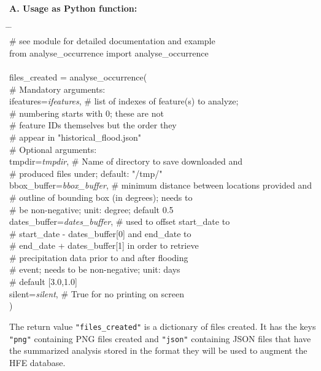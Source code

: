\documentclass[10pt,a4paper,titlepage,parskip]{scrartcl}
\newenvironment{ttfont}{\fontfamily{\ttdefault}\selectfont}{\par}
\newcommand{\GRAU}[1]{\textcolor{ufzgray2}{#1}}
\begin{document}
\textbf{A. Usage as Python function:}
\begin{framed}
	\vspace*{-1.2cm}
	\begin{ttfont}
		\begin{tabbing}
			\hspace{1.0cm} \= \hspace{5.2cm} \= \kill \\[4pt]
			\GRAU{\# see module for detailed documentation and example}\\
			from analyse\_occurrence import analyse\_occurrence\\
			\\
			files\_created = analyse\_occurrence(\\
			\> \GRAU{\# Mandatory arguments:}\\
			\> ifeatures=\textit{ifeatures}, \> \GRAU{\# list of indexes of feature(s) to analyze;}\\
			\> \> \GRAU{\# numbering starts with 0; these are not }\\
			\> \> \GRAU{\# feature IDs themselves but the order they }\\
			\> \> \GRAU{\# appear in "historical\_flood.json"}\\
			\> \GRAU{\# Optional arguments:}\\
			\> tmpdir=\textit{tmpdir}, \> \GRAU{\# Name of directory to save downloaded and}\\
			\> \> \GRAU{\# produced files under; default: "/tmp/"}\\
			\> bbox\_buffer=\textit{bbox\_buffer}, \> \GRAU{\# minimum distance between locations provided and}\\
			\> \> \GRAU{\# outline of bounding box (in degrees); needs to}\\
			\> \> \GRAU{\# be non-negative; unit: degree; default 0.5}\\
			\> dates\_buffer=\textit{dates\_buffer}, \> \GRAU{\# used to offset start\_date to}\\
			\> \> \GRAU{\# start\_date - dates\_buffer[0] and end\_date to }\\
			\> \> \GRAU{\# end\_date + dates\_buffer[1] in order to retrieve}\\
			\> \> \GRAU{\# precipitation data prior to and after flooding}\\
			\> \> \GRAU{\# event; needs to be non-negative; unit: days}\\
			\> \> \GRAU{\# default [3.0,1.0]}\\
			\> silent=\textit{silent}, \> \GRAU{\# True for no printing on screen}\\
			\> ) \> 
		\end{tabbing}
	\end{ttfont}
	\vspace*{-0.3cm}
\end{framed}
\vspace*{-0.3cm}
The return value \texttt{"files\_created"} is a dictionary of files created. It has the keys \texttt{"png"} containing PNG files created and \texttt{"json"} containing JSON files that have the summarized analysis stored in the format they will be used to augment the HFE database.
\pagebreak
\end{document}
